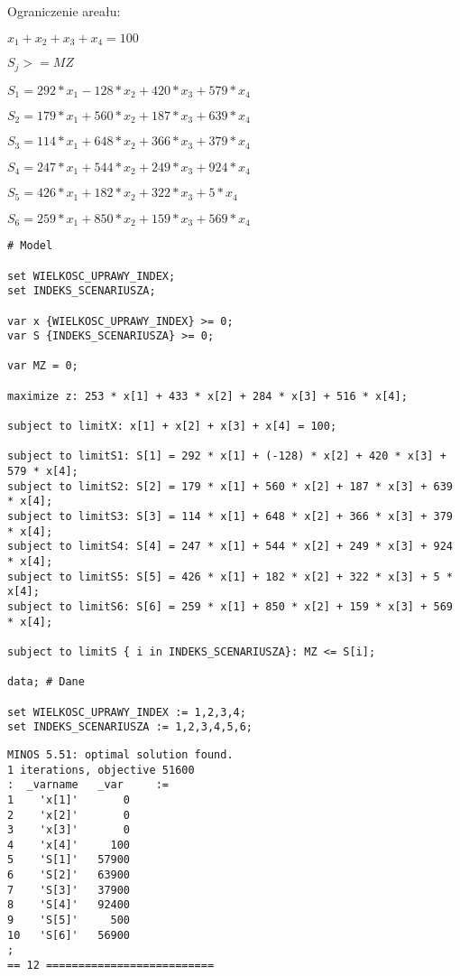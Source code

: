 \documentclass{article}
\begin{document}
\noindent
Ograniczenie areału:

$x_1 + x_2 + x_3 + x_4 = 100$

$S_j >= MZ$

$S_1 = 292 * x_1 - 128 * x_2 + 420 * x_3 + 579 * x_4$

$S_2 = 179 * x_1 + 560 * x_2 + 187 * x_3 + 639 * x_4$

$S_3 = 114 * x_1 + 648 * x_2 + 366 * x_3 + 379 * x_4$

$S_4 = 247 * x_1 + 544 * x_2 + 249 * x_3 + 924 * x_4$

$S_5 = 426 * x_1 + 182 * x_2 + 322 * x_3 + 5 * x_4$

$S_6 = 259 * x_1 + 850 * x_2 + 159 * x_3 + 569 * x_4$

\lstset{language=AMPL}
\begin{lstlisting}[caption={Model napisany w języku AMPL},label=DescriptiveLabel]
# Model

set WIELKOSC_UPRAWY_INDEX;
set INDEKS_SCENARIUSZA;

var x {WIELKOSC_UPRAWY_INDEX} >= 0;
var S {INDEKS_SCENARIUSZA} >= 0;

var MZ = 0;

maximize z: 253 * x[1] + 433 * x[2] + 284 * x[3] + 516 * x[4];

subject to limitX: x[1] + x[2] + x[3] + x[4] = 100;

subject to limitS1: S[1] = 292 * x[1] + (-128) * x[2] + 420 * x[3] + 579 * x[4];
subject to limitS2: S[2] = 179 * x[1] + 560 * x[2] + 187 * x[3] + 639 * x[4];
subject to limitS3: S[3] = 114 * x[1] + 648 * x[2] + 366 * x[3] + 379 * x[4];
subject to limitS4: S[4] = 247 * x[1] + 544 * x[2] + 249 * x[3] + 924 * x[4];
subject to limitS5: S[5] = 426 * x[1] + 182 * x[2] + 322 * x[3] + 5 * x[4];
subject to limitS6: S[6] = 259 * x[1] + 850 * x[2] + 159 * x[3] + 569 * x[4];

subject to limitS { i in INDEKS_SCENARIUSZA}: MZ <= S[i];

data; # Dane

set WIELKOSC_UPRAWY_INDEX := 1,2,3,4;
set INDEKS_SCENARIUSZA := 1,2,3,4,5,6;
\end{lstlisting}

\lstset{language=AMPL}
\begin{lstlisting}[caption={Wynik modlu z solwerem MINOS.},label=DescriptiveLabel]
MINOS 5.51: optimal solution found.
1 iterations, objective 51600
:  _varname   _var     :=
1    'x[1]'       0
2    'x[2]'       0
3    'x[3]'       0
4    'x[4]'     100
5    'S[1]'   57900
6    'S[2]'   63900
7    'S[3]'   37900
8    'S[4]'   92400
9    'S[5]'     500
10   'S[6]'   56900
;
== 12 ==========================
\end{lstlisting}
\end{document}
